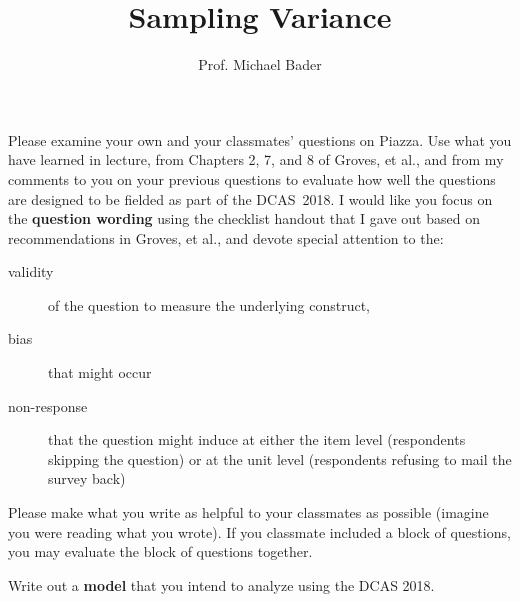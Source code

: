 \documentclass[11pt]{homework}
\title{Sampling Variance}
\author{Prof. Michael Bader}
\begin{document}
\maketitle 

\begin{questions}

\question[14] Please examine your own and your classmates' questions on Piazza. Use what you have learned in lecture, from Chapters 2, 7, and 8 of Groves, et al., and from my comments to you on your previous questions to evaluate how well the questions are designed to be fielded as part of the DCAS~2018. I would like you focus on the \textbf{question wording} using the checklist handout that I gave out based on recommendations in Groves, et al., and devote special attention to the: 
\begin{description}
\item[validity] of the question to measure the underlying construct, 
\item[bias] that might occur 
\item[non-response] that the question might induce at either the item level (respondents skipping the question) or at the unit level (respondents refusing to mail the survey back)
\end{description}

Please make what you write as helpful to your classmates as possible (imagine you were reading what you wrote). If you classmate included a block of questions, you may evaluate the block of questions together. 

\question Write out a \textbf{model} that you intend to analyze using the DCAS 2018. 
\end{questions}
\end{document}
